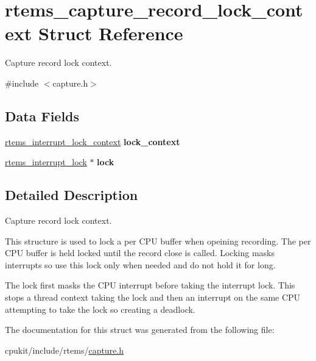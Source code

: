 \hypertarget{structrtems__capture__record__lock__context}{}\section{rtems\+\_\+capture\+\_\+record\+\_\+lock\+\_\+context Struct Reference}
\label{structrtems__capture__record__lock__context}


Capture record lock context.  




{\ttfamily \#include $<$capture.\+h$>$}

\subsection*{Data Fields}
\begin{DoxyCompactItemize}
\item 
\mbox{\label{structrtems__capture__record__lock__context_a7d39eb61e31dfb0aca152e43c7b3ff7c}} 
\mbox{\hyperlink{group__ClassicINTRLocks_gab9d4b488f1537323799db7c1fa69b9aa}{rtems\+\_\+interrupt\+\_\+lock\+\_\+context}} {\bfseries lock\+\_\+context}
\item 
\mbox{\label{structrtems__capture__record__lock__context_ac16f8cb4133bdbd01a7dec9e82ea8bd2}} 
\mbox{\hyperlink{group__ClassicINTRLocks_ga7d4b54b01fd1507aa842d5fbc7b11177}{rtems\+\_\+interrupt\+\_\+lock}} $\ast$ {\bfseries lock}
\end{DoxyCompactItemize}


\subsection{Detailed Description}
Capture record lock context. 

This structure is used to lock a per C\+PU buffer when opeining recording. The per C\+PU buffer is held locked until the record close is called. Locking masks interrupts so use this lock only when needed and do not hold it for long.

The lock first masks the C\+PU interrupt before taking the interrupt lock. This stops a thread context taking the lock and then an interrupt on the same C\+PU attempting to take the lock so creating a deadlock. 

The documentation for this struct was generated from the following file\+:\begin{DoxyCompactItemize}
\item 
cpukit/include/rtems/\mbox{\hyperlink{capture_8h}{capture.\+h}}\end{DoxyCompactItemize}
